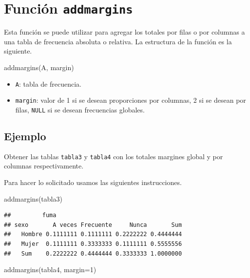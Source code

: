 \documentclass[
]{book}
\makeatletter
\newenvironment{Shaded}{\begin{snugshade}}{\end{snugshade}}
\newcommand{\AttributeTok}[1]{\textcolor[rgb]{0.77,0.63,0.00}{#1}}
\newcommand{\DecValTok}[1]{\textcolor[rgb]{0.00,0.00,0.81}{#1}}
\newcommand{\FunctionTok}[1]{\textcolor[rgb]{0.00,0.00,0.00}{#1}}
\newcommand{\NormalTok}[1]{#1}
\providecommand{\tightlist}{%
  \setlength{\itemsep}{0pt}\setlength{\parskip}{0pt}}
\newenvironment{kframe}{%
\medskip{}
\setlength{\fboxsep}{.8em}
 \def\at@end@of@kframe{}%
 \ifinner\ifhmode%
  \def\at@end@of@kframe{\end{minipage}}%
  \begin{minipage}{\columnwidth}%
 \fi\fi%
 \def\FrameCommand##1{\hskip\@totalleftmargin \hskip-\fboxsep
 \colorbox{shadecolor}{##1}\hskip-\fboxsep
     \hskip-\linewidth \hskip-\@totalleftmargin \hskip\columnwidth}%
 \MakeFramed {\advance\hsize-\width
   \@totalleftmargin\z@ \linewidth\hsize
   \@setminipage}}%
 {\par\unskip\endMakeFramed%
 \at@end@of@kframe}
\renewenvironment{Shaded}{\begin{kframe}}{\end{kframe}}
\makeatother
\begin{document}
\hypertarget{funciuxf3n-addmargins}{%
\section{\texorpdfstring{Función \texttt{addmargins} }{Función addmargins }}\label{funciuxf3n-addmargins}}

Esta función se puede utilizar para agregar los totales por filas o por columnas a una tabla de frecuencia absoluta o relativa. La estructura de la función es la siguiente.

\begin{Shaded}
\begin{Highlighting}[]
\FunctionTok{addmargins}\NormalTok{(A, margin)}
\end{Highlighting}
\end{Shaded}

\begin{itemize}
\tightlist
\item
  \texttt{A}: tabla de frecuencia.
\item
  \texttt{margin}: valor de 1 si se desean proporciones por columnas, 2 si se desean por filas, \texttt{NULL} si se desean frecuencias globales.
\end{itemize}

\hypertarget{ejemplo-27}{%
\subsection*{Ejemplo}\label{ejemplo-27}}

Obtener las tablas \texttt{tabla3} y \texttt{tabla4} con los totales margines global y por columnas respectivamente.

Para hacer lo solicitado usamos las siguientes instrucciones.

\begin{Shaded}
\begin{Highlighting}[]
\FunctionTok{addmargins}\NormalTok{(tabla3)}
\end{Highlighting}
\end{Shaded}

\begin{verbatim}
##         fuma
## sexo       A veces Frecuente     Nunca       Sum
##   Hombre 0.1111111 0.1111111 0.2222222 0.4444444
##   Mujer  0.1111111 0.3333333 0.1111111 0.5555556
##   Sum    0.2222222 0.4444444 0.3333333 1.0000000
\end{verbatim}

\begin{Shaded}
\begin{Highlighting}[]
\FunctionTok{addmargins}\NormalTok{(tabla4, }\AttributeTok{margin=}\DecValTok{1}\NormalTok{)}
\end{Highlighting}
\end{Shaded}
\end{document}
